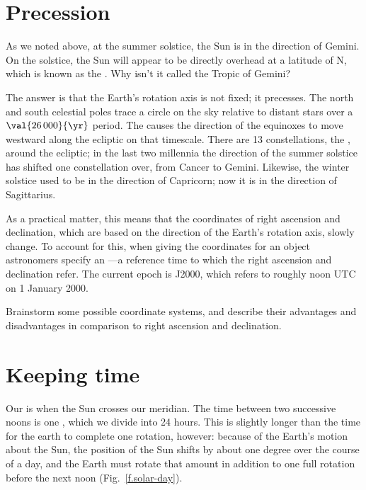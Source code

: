 \section{Precession}
As we noted above, at the summer solstice, the Sun is in the direction of Gemini. On the solstice, the Sun will appear to be directly overhead at a latitude of N, which is known as the .  Why isn't it called the Tropic of Gemini?

The answer is that the Earth's rotation axis is not fixed; it precesses. The north and south celestial poles trace a circle on the sky relative to distant stars over a $\val{26\,000}{\yr}$ period. The causes the direction of the equinoxes to move westward along the ecliptic on that timescale. There are 13 constellations, the , around the ecliptic; in the last two millennia the direction of the summer solstice has shifted one constellation over, from Cancer to Gemini. Likewise, the winter solstice used to be in the direction of Capricorn; now it is in the direction of Sagittarius.

As a practical matter, this means that the coordinates of right ascension and declination, which are based on the direction of the Earth's rotation axis, slowly change. To account for this, when giving the coordinates for an object astronomers specify an ---a reference time to which the right ascension and declination refer. The current epoch is J2000, which refers to roughly noon UTC on 1 January 2000.

\begin{exercisebox}
Brainstorm some possible coordinate systems, and describe their advantages and disadvantages in comparison to right ascension and declination.
\end{exercisebox}

\section{Keeping time}

Our  is when the Sun crosses our meridian. The time between two successive noons is one , which we divide into 24 hours. This is slightly longer than the time for the earth to complete one rotation, however: because of the Earth's motion about the Sun, the position of the Sun shifts by about one degree over the course of a day, and the Earth must rotate that amount in addition to one full rotation before the next noon (Fig.~\ref{f.solar-day}).


